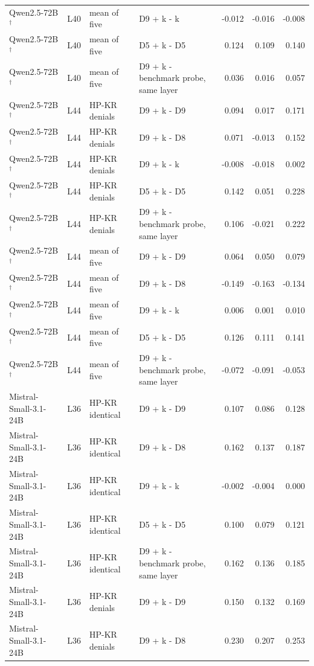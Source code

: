 \begin{table}
\begin{tabular}{llllrrr}
Qwen2.5-72B$^\dagger$ & L40 & mean of five & D9 + k - k & -0.012 & -0.016 & -0.008 \\
Qwen2.5-72B$^\dagger$ & L40 & mean of five & D5 + k - D5 & 0.124 & 0.109 & 0.140 \\
Qwen2.5-72B$^\dagger$ & L40 & mean of five & D9 + k - benchmark probe, same layer & 0.036 & 0.016 & 0.057 \\
Qwen2.5-72B$^\dagger$ & L44 & HP-KR denials & D9 + k - D9 & 0.094 & 0.017 & 0.171 \\
Qwen2.5-72B$^\dagger$ & L44 & HP-KR denials & D9 + k - D8 & 0.071 & -0.013 & 0.152 \\
Qwen2.5-72B$^\dagger$ & L44 & HP-KR denials & D9 + k - k & -0.008 & -0.018 & 0.002 \\
Qwen2.5-72B$^\dagger$ & L44 & HP-KR denials & D5 + k - D5 & 0.142 & 0.051 & 0.228 \\
Qwen2.5-72B$^\dagger$ & L44 & HP-KR denials & D9 + k - benchmark probe, same layer & 0.106 & -0.021 & 0.222 \\
Qwen2.5-72B$^\dagger$ & L44 & mean of five & D9 + k - D9 & 0.064 & 0.050 & 0.079 \\
Qwen2.5-72B$^\dagger$ & L44 & mean of five & D9 + k - D8 & -0.149 & -0.163 & -0.134 \\
Qwen2.5-72B$^\dagger$ & L44 & mean of five & D9 + k - k & 0.006 & 0.001 & 0.010 \\
Qwen2.5-72B$^\dagger$ & L44 & mean of five & D5 + k - D5 & 0.126 & 0.111 & 0.141 \\
Qwen2.5-72B$^\dagger$ & L44 & mean of five & D9 + k - benchmark probe, same layer & -0.072 & -0.091 & -0.053 \\
Mistral-Small-3.1-24B & L36 & HP-KR identical & D9 + k - D9 & 0.107 & 0.086 & 0.128 \\
Mistral-Small-3.1-24B & L36 & HP-KR identical & D9 + k - D8 & 0.162 & 0.137 & 0.187 \\
Mistral-Small-3.1-24B & L36 & HP-KR identical & D9 + k - k & -0.002 & -0.004 & 0.000 \\
Mistral-Small-3.1-24B & L36 & HP-KR identical & D5 + k - D5 & 0.100 & 0.079 & 0.121 \\
Mistral-Small-3.1-24B & L36 & HP-KR identical & D9 + k - benchmark probe, same layer & 0.162 & 0.136 & 0.185 \\
Mistral-Small-3.1-24B & L36 & HP-KR denials & D9 + k - D9 & 0.150 & 0.132 & 0.169 \\
Mistral-Small-3.1-24B & L36 & HP-KR denials & D9 + k - D8 & 0.230 & 0.207 & 0.253 \\

\end{tabular}
\end{table}
